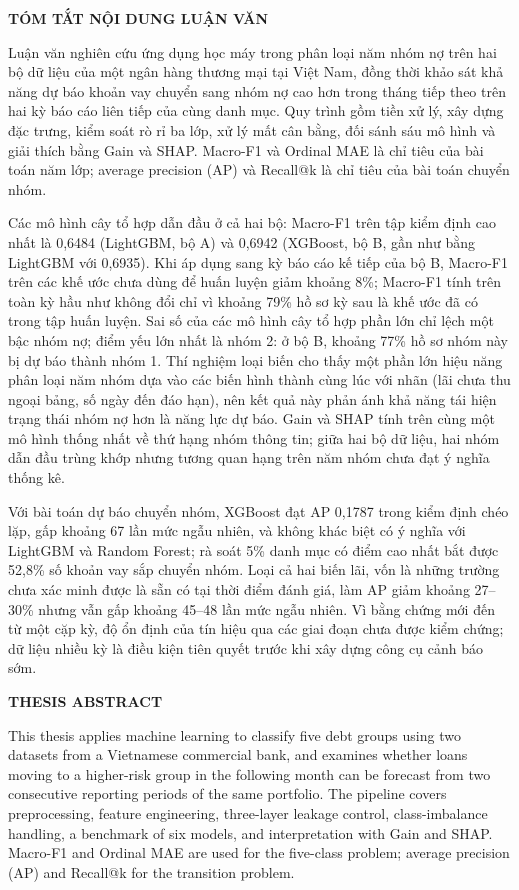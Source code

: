 \newpage
\begin{center}
\fontsize{15pt}{18pt}\selectfont
 \bf{TÓM TẮT NỘI DUNG LUẬN VĂN}
\end{center}
\par
Luận văn nghiên cứu ứng dụng học máy trong phân loại năm nhóm nợ trên hai bộ dữ liệu của một ngân hàng thương mại tại Việt Nam, đồng thời khảo sát khả năng dự báo khoản vay chuyển sang nhóm nợ cao hơn trong tháng tiếp theo trên hai kỳ báo cáo liên tiếp của cùng danh mục. Quy trình gồm tiền xử lý, xây dựng đặc trưng, kiểm soát rò rỉ ba lớp, xử lý mất cân bằng, đối sánh sáu mô hình và giải thích bằng Gain và SHAP. Macro-F1 và Ordinal MAE là chỉ tiêu của bài toán năm lớp; average precision (AP) và Recall@k là chỉ tiêu của bài toán chuyển nhóm.

Các mô hình cây tổ hợp dẫn đầu ở cả hai bộ: Macro-F1 trên tập kiểm định cao nhất là 0,6484 (LightGBM, bộ A) và 0,6942 (XGBoost, bộ B, gần như bằng LightGBM với 0,6935). Khi áp dụng sang kỳ báo cáo kế tiếp của bộ B, Macro-F1 trên các khế ước chưa dùng để huấn luyện giảm khoảng 8\%; Macro-F1 tính trên toàn kỳ hầu như không đổi chỉ vì khoảng 79\% hồ sơ kỳ sau là khế ước đã có trong tập huấn luyện. Sai số của các mô hình cây tổ hợp phần lớn chỉ lệch một bậc nhóm nợ; điểm yếu lớn nhất là nhóm 2: ở bộ B, khoảng 77\% hồ sơ nhóm này bị dự báo thành nhóm 1. Thí nghiệm loại biến cho thấy một phần lớn hiệu năng phân loại năm nhóm dựa vào các biến hình thành cùng lúc với nhãn (lãi chưa thu ngoại bảng, số ngày đến đáo hạn), nên kết quả này phản ánh khả năng tái hiện trạng thái nhóm nợ hơn là năng lực dự báo. Gain và SHAP tính trên cùng một mô hình thống nhất về thứ hạng nhóm thông tin; giữa hai bộ dữ liệu, hai nhóm dẫn đầu trùng khớp nhưng tương quan hạng trên năm nhóm chưa đạt ý nghĩa thống kê.

Với bài toán dự báo chuyển nhóm, XGBoost đạt AP 0,1787 trong kiểm định chéo lặp, gấp khoảng 67 lần mức ngẫu nhiên, và không khác biệt có ý nghĩa với LightGBM và Random Forest; rà soát 5\% danh mục có điểm cao nhất bắt được 52,8\% số khoản vay sắp chuyển nhóm. Loại cả hai biến lãi, vốn là những trường chưa xác minh được là sẵn có tại thời điểm đánh giá, làm AP giảm khoảng 27--30\% nhưng vẫn gấp khoảng 45--48 lần mức ngẫu nhiên. Vì bằng chứng mới đến từ một cặp kỳ, độ ổn định của tín hiệu qua các giai đoạn chưa được kiểm chứng; dữ liệu nhiều kỳ là điều kiện tiên quyết trước khi xây dựng công cụ cảnh báo sớm.

\newpage
\begin{center}
\fontsize{15pt}{18pt}\selectfont
 \bf{THESIS ABSTRACT}
\end{center}
\par
This thesis applies machine learning to classify five debt groups using two datasets from a Vietnamese commercial bank, and examines whether loans moving to a higher-risk group in the following month can be forecast from two consecutive reporting periods of the same portfolio. The pipeline covers preprocessing, feature engineering, three-layer leakage control, class-imbalance handling, a benchmark of six models, and interpretation with Gain and SHAP. Macro-F1 and Ordinal MAE are used for the five-class problem; average precision (AP) and Recall@k for the transition problem.

